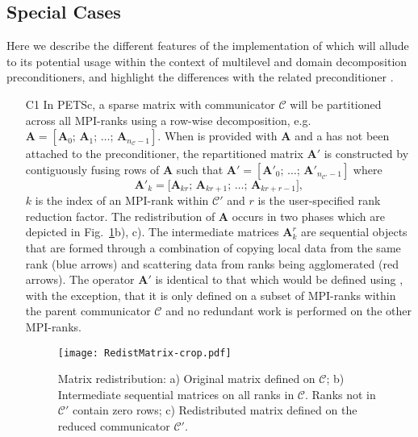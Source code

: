 \documentclass[]{siamart0216}
\newcommand{\dmat}[1]{\mathbf{#1}}
\begin{document}
\subsection{Special Cases}
Here we describe the different features of the implementation of  which will allude
to its potential usage within the context of multilevel and domain decomposition preconditioners, and highlight
the differences with the related preconditioner .
\begin{itemize}
\setlength\itemsep{0em}
\item[C1] In PETSc, a sparse matrix with communicator $\mathcal C$ will be partitioned across 
	all MPI-ranks using a row-wise decomposition, e.g.~
	$\dmat A = [ \dmat A_0; \, \dmat A_1; \, \dots; \, \dmat A_{n_{\mathcal C}-1}]$.
	When  is provided with $\dmat A$ and a  has not been 
	attached to the preconditioner, the repartitioned matrix $\dmat A'$ is constructed by 
	contiguously fusing rows of $\dmat A$ such that
	$\dmat A' = [ \dmat A'_0; \, \dots; \, \dmat A'_{n_{\mathcal C'}-1}]$ where
	$$
		\dmat A'_k = \big[ \dmat A_{kr}; \,\dmat  A_{kr+1}; \, \dots; \, \dmat A_{kr + r-1} \big],
	$$ 
	$k$ is the index of an MPI-rank within $\mathcal C'$ and $r$ is the user-specified rank reduction factor.
The redistribution of $\dmat A$ occurs in two phases which are depicted in Fig.~\ref{fig:matredist}b), c).	
	The intermediate matrices $\dmat A^r_k$ are sequential objects that are formed through a combination of copying 
	local data from the same rank (blue arrows) and scattering data from ranks being agglomerated (red arrows).
The operator $\dmat A'$ is identical to that which would be defined using , 
	with the exception, that it is only defined on a subset of MPI-ranks within the parent communicator ${\mathcal C}$
	and no redundant work is performed on the other MPI-ranks.
\begin{figure}[h!]
\centering
\texttt{[image: RedistMatrix-crop.pdf]}
\caption{Matrix redistribution: a) Original matrix defined on $\mathcal C$; b) Intermediate sequential matrices on all ranks in $\mathcal C$. Ranks not in $\mathcal C'$ contain zero rows; c) Redistributed matrix defined on the reduced communicator $\mathcal C'$. \label{fig:matredist}}
\end{figure}


\end{itemize}
\end{document}

